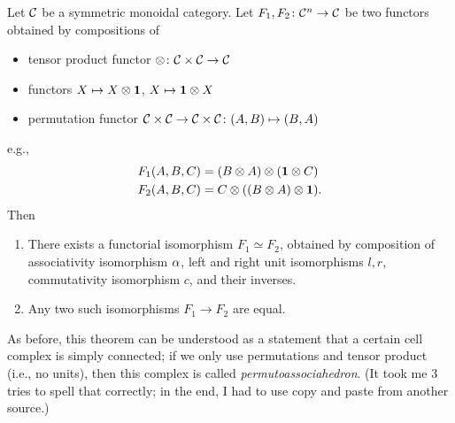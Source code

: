 \begin{theorem}\label{t:maclane-symmetric}\par

  \noindent
  Let $\mathcal{C}$ be a symmetric monoidal category. Let $F_1, F_2\colon \mathcal{C}^n\to
  \mathcal{C}$ be two functors obtained by compositions of

  \begin{itemize}
    \item tensor product functor $\otimes\colon \mathcal{C}\times \mathcal{C}\to \mathcal{C}$
    \item functors $X\mapsto X\otimes \mathbf{1}$, $X\mapsto \mathbf{1} \otimes X$
    \item permutation functor $\mathcal{C}\times \mathcal{C} \to \mathcal{C}\times \mathcal{C}
          \colon (A, B)\mapsto (B,A)$
  \end{itemize}

  e.g.,
  \begin{align*}
    F_1(A,B,C)&=(B\otimes A)\otimes (\mathbf{1}\otimes C)\\
    F_2(A,B,C)&=C\otimes ((B\otimes  A)\otimes \mathbf{1}).
  \end{align*}
  Then

  \begin{enumerate}
    \item There exists a functorial isomorphism $F_1\simeq F_2$, obtained
      by composition of associativity isomorphism $\alpha$, left and right
      unit isomorphisms $l,r$, commutativity isomorphism $c$, and their
      inverses.
    \item Any two such isomorphisms $F_1\to F_2$ are equal.
  \end{enumerate}

\end{theorem}
As before, this theorem can be understood as a statement that a certain cell
complex is simply connected; if we only use permutations and tensor product
(i.e., no units), then this complex is called \emph{permutoassociahedron}. (It
took me 3 tries to spell that correctly; in the end, I had to use copy and
paste from another source.)

\clearpage

